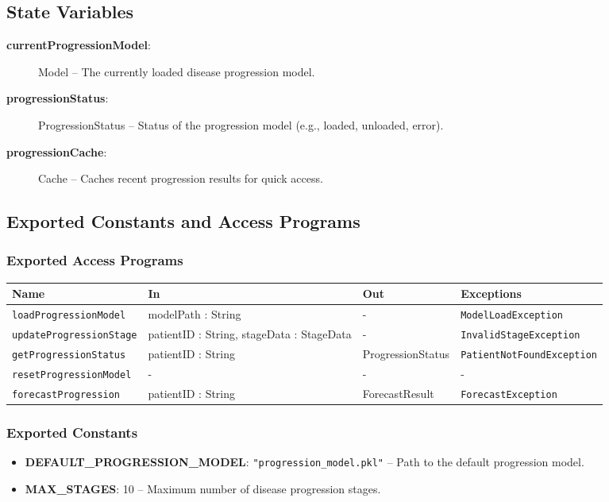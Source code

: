 \documentclass[12pt, titlepage]{article}
\begin{document}
\subsection{State Variables}
\begin{description}
    \item[\textbf{currentProgressionModel}:] Model -- The currently loaded disease progression model.
    \item[\textbf{progressionStatus}:] ProgressionStatus -- Status of the progression model (e.g., loaded, unloaded, error).
    \item[\textbf{progressionCache}:] Cache -- Caches recent progression results for quick access.
\end{description}

\subsection{Exported Constants and Access Programs}

\subsubsection{Exported Access Programs}
\begin{center}
  \begin{tabular}{|l|l|l|l|}
    \hline
    \textbf{Name} & \textbf{In} & \textbf{Out} & \textbf{Exceptions} \\
    \hline 
    \texttt{loadProgressionModel} & modelPath : String & - & \texttt{ModelLoadException} \\
    \hline
    \texttt{updateProgressionStage} & patientID : String, stageData : StageData & - & \texttt{InvalidStageException} \\
    \hline
    \texttt{getProgressionStatus} & patientID : String & ProgressionStatus & \texttt{PatientNotFoundException} \\
    \hline
    \texttt{resetProgressionModel} & - & - & - \\
    \hline
    \texttt{forecastProgression} & patientID : String & ForecastResult & \texttt{ForecastException} \\
    \hline
  \end{tabular}
\end{center}

\subsubsection{Exported Constants}
\begin{itemize}
    \item \textbf{DEFAULT\_PROGRESSION\_MODEL}: \texttt{"progression\_model.pkl"} -- Path to the default progression model.
    \item \textbf{MAX\_STAGES}: 10 -- Maximum number of disease progression stages.
\end{itemize}
\end{document}
